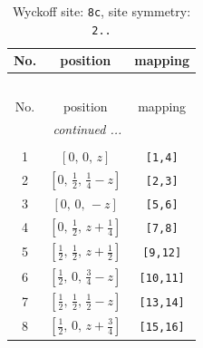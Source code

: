 \documentclass[fleqn,8pt]{jsarticle}
\begin{document}
\renewcommand{\arraystretch}{1.2}
\begin{longtable}{ccc}
\caption{Wyckoff site: {\tt 8c}, site symmetry: {\tt 2..}}
 \\
 \hline \hline
No. & position & mapping \\ \hline \endfirsthead

\multicolumn{2}{l}{\tablename\ \thetable{}} \\
 \hline \hline
No. & position & mapping \\ \hline \endhead

 \hline \hline
\multicolumn{2}{r}{\footnotesize\it continued ...} \\ \endfoot

 \hline \hline
\multicolumn{2}{r}{} \\ \endlastfoot

1 & $\left[ 0,\, 0,\, z \right]$ & {\tt [1,4]} \\ \hline
2 & $\left[ 0,\, \frac{1}{2},\, \frac{1}{4} - z \right]$ & {\tt [2,3]} \\ \hline
3 & $\left[ 0,\, 0,\, - z \right]$ & {\tt [5,6]} \\ \hline
4 & $\left[ 0,\, \frac{1}{2},\, z + \frac{1}{4} \right]$ & {\tt [7,8]} \\ \hline
5 & $\left[ \frac{1}{2},\, \frac{1}{2},\, z + \frac{1}{2} \right]$ & {\tt [9,12]} \\ \hline
6 & $\left[ \frac{1}{2},\, 0,\, \frac{3}{4} - z \right]$ & {\tt [10,11]} \\ \hline
7 & $\left[ \frac{1}{2},\, \frac{1}{2},\, \frac{1}{2} - z \right]$ & {\tt [13,14]} \\ \hline
8 & $\left[ \frac{1}{2},\, 0,\, z + \frac{3}{4} \right]$ & {\tt [15,16]} \\
\end{longtable}
\renewcommand{\arraystretch}{1.2}
\end{document}

